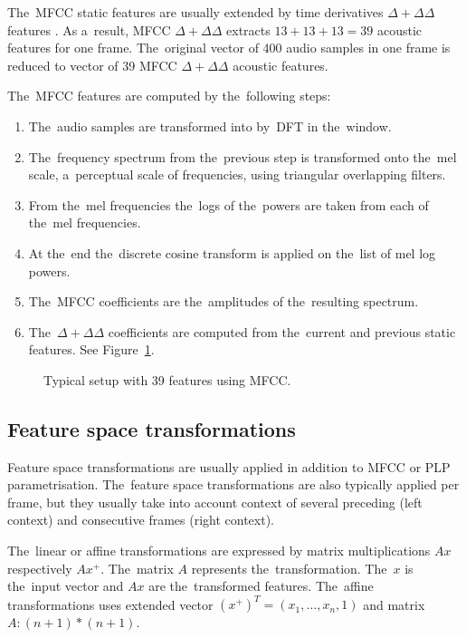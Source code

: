 The~\ac{MFCC} static features are usually extended by time derivatives $\Delta+\Delta\Delta$ features \cite{psutka2001comparison}.
As a~result, \ac{MFCC} $\Delta+\Delta\Delta$ extracts $13 + 13 + 13 = 39$ acoustic features for one frame. 
The~original vector of 400 audio samples in one frame is reduced to vector of 39 \ac{MFCC} $\Delta+\Delta\Delta$ acoustic features.

The~\ac{MFCC} features are computed by the~following steps:
{\small \begin{enumerate}
    \item The~audio samples are transformed into  by~\ac{DFT} in the~window.
    \item The~frequency spectrum from the~previous step is transformed onto the~mel scale, a~perceptual scale of frequencies, using triangular overlapping filters.
    \item From the~mel frequencies the~logs of the~powers are taken from each of the~mel frequencies.
    \item At the~end the~discrete cosine transform is applied on the~list of mel log powers.
    \item The~\ac{MFCC} coefficients are the~amplitudes of the~resulting spectrum.
    \item The~$\Delta+\Delta\Delta$ coefficients are computed from the~current and previous static features. See Figure~\ref{fig:delta}.
\end{enumerate}}

\begin{figure}
    \begin{center}
    
    \caption{Typical setup with 39 features using \ac{MFCC}.}
    \label{fig:delta} 
    \end{center}
\end{figure}

\subsection*{Feature space transformations}
Feature space transformations are usually applied in addition to \ac{MFCC} or \ac{PLP} parametrisation.
The~feature space transformations are also typically applied per frame, but they usually take into account context of several preceding (left context) and consecutive frames (right context).

The~linear or affine transformations are expressed by matrix multiplications $Ax$ respectively $Ax^+$.
The~matrix $A$ represents the~transformation. 
The~$x$ is the~input vector and $Ax$ are the~transformed features.
The~affine transformations uses extended vector $(x^+)^T = (x_1, \ldots, x_n, 1)$ and matrix $A: (n+1)*(n+1)$.

